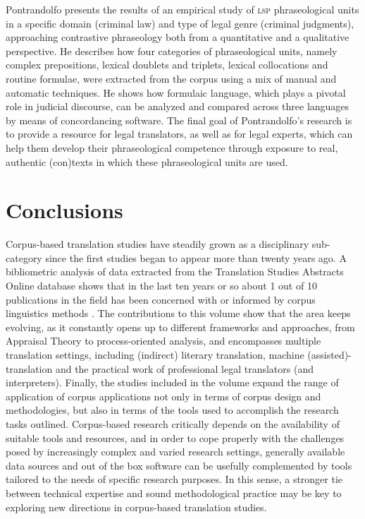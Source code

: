 \documentclass[output=paper]{LSP/langsci}
\begin{document}
Pontrandolfo presents the results of an empirical study of \textsc{lsp} phraseological units in a specific domain (criminal law) and type of legal genre (criminal judgments), approaching contrastive phraseology both from a quantitative and a qualitative perspective. He describes how four categories of phraseological units, namely complex prepositions, lexical doublets and triplets, lexical collocations and routine formulae, were extracted from the corpus using a mix of manual and automatic techniques. He shows how formulaic language, which plays a pivotal role in judicial discourse, can be analyzed and compared across three languages by means of concordancing software. The final goal of Pontrandolfo’s research is to provide a resource for legal translators, as well as for legal experts, which can help them develop their phraseological competence through exposure to real, authentic (con)texts in which these phraseological units are used.

\section{Conclusions}
Corpus-based translation studies have steadily grown as a disciplinary sub-category since the first studies began to appear more than twenty years ago. A bibliometric analysis of data extracted from the Translation Studies Abstracts Online database shows that in the last ten years or so about 1 out of 10 publications in the field has been concerned with or informed by corpus linguistics methods \citep{Zanettin2015}. The contributions to this volume show that the area keeps evolving, as it constantly opens up to different frameworks and approaches, from Appraisal Theory to process-oriented analysis, and encompasses multiple translation settings, including (indirect) literary translation, machine (assisted)-translation and the practical work of professional legal translators (and interpreters). Finally, the studies included in the volume expand the range of application of corpus applications not only in terms of corpus design and methodologies, but also in terms of the tools used to accomplish the research tasks outlined. Corpus-based research critically depends on the availability of suitable tools and resources, and in order to cope properly with the challenges posed by increasingly complex and varied research settings, generally available data sources and out of the box software can be usefully complemented by tools tailored to the needs of specific research purposes. In this sense, a stronger tie between technical expertise and sound methodological practice may be key to exploring new directions in corpus-based translation studies.

\printbibliography[heading=subbibliography,notkeyword=this]
\end{document}
